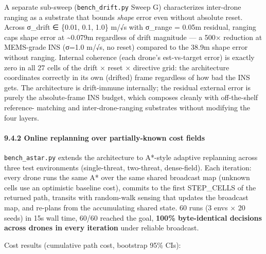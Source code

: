 A separate sub-sweep (\texttt{bench\_drift.py} Sweep G) characterizes
inter-drone ranging as a substrate that bounds \emph{shape} error even
without absolute reset. Across σ\_drift ∈ \{0.01, 0.1, 1.0\} m/√s with
σ\_range = 0.05m residual, ranging caps shape error at
\textasciitilde0.079m regardless of drift magnitude --- a 500× reduction
at MEMS-grade INS (σ=1.0 m/√s, no reset) compared to the 38.9m shape
error without ranging. Internal coherence (each drone's est-vs-target
error) is exactly zero in all 27 cells of the drift × reset × directive
grid: the architecture coordinates correctly in its own (drifted) frame
regardless of how bad the INS gets. The architecture is drift-immune
internally; the residual external error is purely the absolute-frame INS
budget, which composes cleanly with off-the-shelf reference- matching
and inter-drone-ranging substrates without modifying the four layers.

\paragraph{9.4.2 Online replanning over partially-known cost
fields}\label{online-replanning-over-partially-known-cost-fields}

\texttt{bench\_astar.py} extends the architecture to A*-style adaptive
replanning across three test environments (single-threat, two-threat,
dense-field). Each iteration: every drone runs the same A* over the same
shared broadcast map (unknown cells use an optimistic baseline cost),
commits to the first STEP\_CELLS of the returned path, transits with
random-walk sensing that updates the broadcast map, and re-plans from
the accumulating shared state. 60 runs (3 envs × 20 seeds) in 15s wall
time, 60/60 reached the goal, \textbf{100\% byte-identical decisions
across drones in every iteration} under reliable broadcast.

Cost results (cumulative path cost, bootstrap 95\% CIs):

